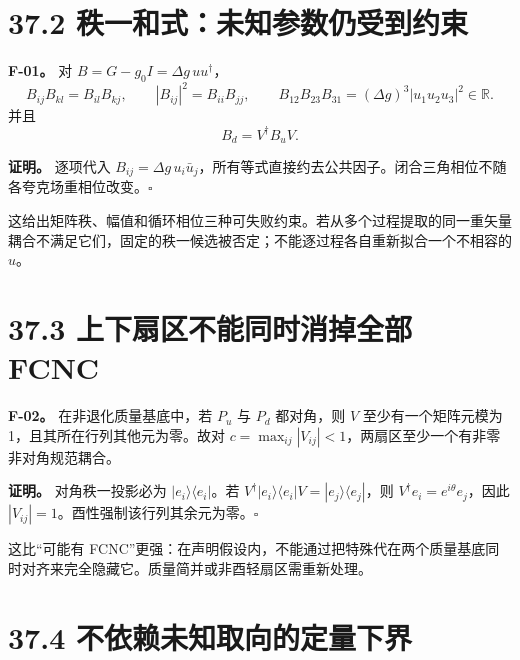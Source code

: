 \documentclass[
  11pt,
  oneside]{book}
\begin{document}
\hypertarget{ux79e9ux4e00ux548cux5f0fux672aux77e5ux53c2ux6570ux4ecdux53d7ux5230ux7ea6ux675f}{%
\section{37.2
秩一和式：未知参数仍受到约束}\label{ux79e9ux4e00ux548cux5f0fux672aux77e5ux53c2ux6570ux4ecdux53d7ux5230ux7ea6ux675f}}

\protect\hypertarget{f-01}{}{}

\textbf{F-01。} 对 \(B=G-g_0I=\Delta g\,uu^\dagger\)， \[
B_{ij}B_{kl}=B_{il}B_{kj},\qquad
|B_{ij}|^2=B_{ii}B_{jj},\qquad
B_{12}B_{23}B_{31}=(\Delta g)^3|u_1u_2u_3|^2\in\mathbb R.
\tag{37.3}
\] 并且 \[
B_d=V^\dagger B_uV.
\tag{37.4}
\]

\textbf{证明。} 逐项代入
\(B_{ij}=\Delta g\,u_i\bar u_j\)，所有等式直接约去公共因子。闭合三角相位不随各夸克场重相位改变。\(\square\)

这给出矩阵秩、幅值和循环相位三种可失败约束。若从多个过程提取的同一重矢量耦合不满足它们，固定的秩一候选被否定；不能逐过程各自重新拟合一个不相容的
\(u\)。

\hypertarget{ux4e0aux4e0bux6247ux533aux4e0dux80fdux540cux65f6ux6d88ux6389ux5168ux90e8-fcnc}{%
\section{37.3 上下扇区不能同时消掉全部
FCNC}\label{ux4e0aux4e0bux6247ux533aux4e0dux80fdux540cux65f6ux6d88ux6389ux5168ux90e8-fcnc}}

\protect\hypertarget{f-02}{}{}

\textbf{F-02。} 在非退化质量基底中，若 \(P_u\) 与 \(P_d\) 都对角，则
\(V\) 至少有一个矩阵元模为1，且其所在行列其他元为零。故对
\(c=\max_{ij}|V_{ij}|<1\)，两扇区至少一个有非零非对角规范耦合。

\textbf{证明。} 对角秩一投影必为 \(|e_i\rangle\langle e_i|\)。若
\(V^\dagger|e_i\rangle\langle e_i|V=|e_j\rangle\langle e_j|\)，则
\(V^\dagger e_i=e^{i\theta}e_j\)，因此
\(|V_{ij}|=1\)。酉性强制该行列其余元为零。\(\square\)

这比``可能有
FCNC''更强：在声明假设内，不能通过把特殊代在两个质量基底同时对齐来完全隐藏它。质量简并或非酉轻扇区需重新处理。

\hypertarget{ux4e0dux4f9dux8d56ux672aux77e5ux53d6ux5411ux7684ux5b9aux91cfux4e0bux754c}{%
\section{37.4
不依赖未知取向的定量下界}\label{ux4e0dux4f9dux8d56ux672aux77e5ux53d6ux5411ux7684ux5b9aux91cfux4e0bux754c}}
\end{document}
